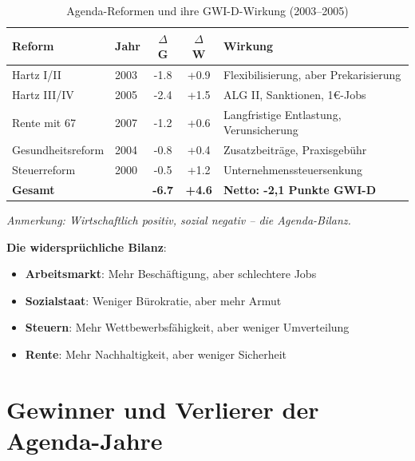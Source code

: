 \begin{table}[ht]
    \centering
    \caption{Agenda-Reformen und ihre GWI-D-Wirkung (2003–2005)}
    \label{tab:reformen_agenda}
    \begin{tabular}{llccp{6cm}}
        \toprule
        \textbf{Reform} & \textbf{Jahr} & \textbf{$\Delta$ G} & \textbf{$\Delta$ W} & \textbf{Wirkung} \\
        \midrule
        Hartz I/II & 2003 & -1.8 & +0.9 & Flexibilisierung, aber Prekarisierung \\
        Hartz III/IV & 2005 & -2.4 & +1.5 & ALG II, Sanktionen, 1€-Jobs \\
        Rente mit 67 & 2007 & -1.2 & +0.6 & Langfristige Entlastung, Verunsicherung \\
        Gesundheitsreform & 2004 & -0.8 & +0.4 & Zusatzbeiträge, Praxisgebühr \\
        Steuerreform & 2000 & -0.5 & +1.2 & Unternehmenssteuersenkung \\
        \midrule
        \textbf{Gesamt} & & \textbf{-6.7} & \textbf{+4.6} & \textbf{Netto: -2,1 Punkte GWI-D} \\
        \bottomrule
    \end{tabular}
\end{table}

\begin{flushleft}
\footnotesize{\textit{Anmerkung: Wirtschaftlich positiv, sozial negativ – die Agenda-Bilanz.}}
\end{flushleft}

\textbf{Die widersprüchliche Bilanz}:
\begin{itemize}
    \item \textbf{Arbeitsmarkt}: Mehr Beschäftigung, aber schlechtere Jobs
    \item \textbf{Sozialstaat}: Weniger Bürokratie, aber mehr Armut
    \item \textbf{Steuern}: Mehr Wettbewerbsfähigkeit, aber weniger Umverteilung
    \item \textbf{Rente}: Mehr Nachhaltigkeit, aber weniger Sicherheit
\end{itemize}

\section{Gewinner und Verlierer der Agenda-Jahre}

